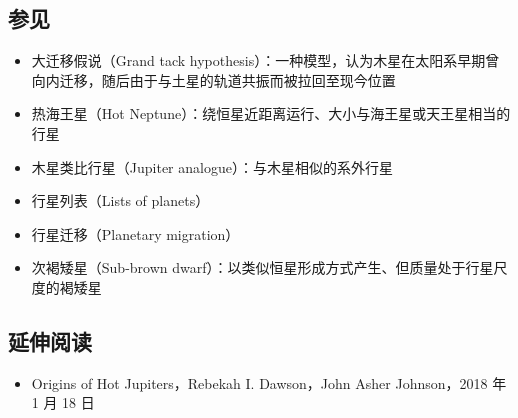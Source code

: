\subsection{参见}
\begin{itemize}
\item 大迁移假说（Grand tack hypothesis）：一种模型，认为木星在太阳系早期曾向内迁移，随后由于与土星的轨道共振而被拉回至现今位置
\item 热海王星（Hot Neptune）：绕恒星近距离运行、大小与海王星或天王星相当的行星
\item 木星类比行星（Jupiter analogue）：与木星相似的系外行星
\item 行星列表（Lists of planets）
\item 行星迁移（Planetary migration）
\item 次褐矮星（Sub-brown dwarf）：以类似恒星形成方式产生、但质量处于行星尺度的褐矮星
\end{itemize}
\subsection{延伸阅读}
\begin{itemize}
\item Origins of Hot Jupiters，Rebekah I. Dawson，John Asher Johnson，2018 年 1 月 18 日
\end{itemize}